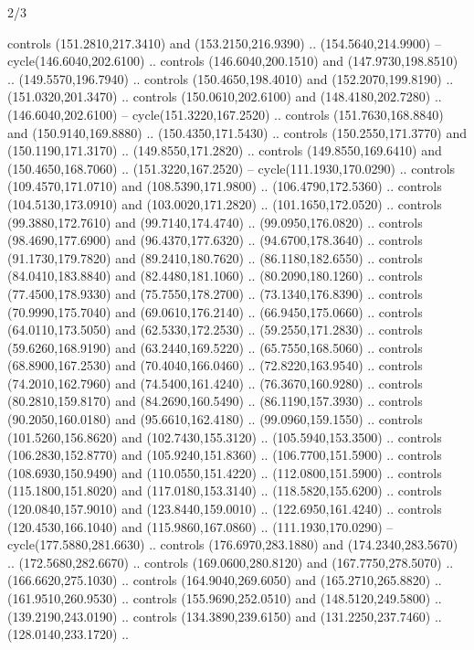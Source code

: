 \begin{flagdescription}{2/3}
\begin{scope}[shift={(0.5\flaglength,0.5)},scale=\flagwidth/480]
\begin{scope}[y=0.8pt, x=0.80pt, yscale=-1,shift={(-450,-300)}]
\begin{scope}[cm={{1.02948,0.0,0.0,1.02948,(-13.26599,6.99414)}}]
\begin{scope}[shift={(341.0917,90.34325)}]
  controls (151.2810,217.3410) and (153.2150,216.9390) .. (154.5640,214.9900) --
  cycle(146.6040,202.6100) .. controls (146.6040,200.1510) and
  (147.9730,198.8510) .. (149.5570,196.7940) .. controls (150.4650,198.4010) and
  (152.2070,199.8190) .. (151.0320,201.3470) .. controls (150.0610,202.6100) and
  (148.4180,202.7280) .. (146.6040,202.6100) -- cycle(151.3220,167.2520) ..
  controls (151.7630,168.8840) and (150.9140,169.8880) .. (150.4350,171.5430) ..
  controls (150.2550,171.3770) and (150.1190,171.3170) .. (149.8550,171.2820) ..
  controls (149.8550,169.6410) and (150.4650,168.7060) .. (151.3220,167.2520) --
  cycle(111.1930,170.0290) .. controls (109.4570,171.0710) and
  (108.5390,171.9800) .. (106.4790,172.5360) .. controls (104.5130,173.0910) and
  (103.0020,171.2820) .. (101.1650,172.0520) .. controls (99.3880,172.7610) and
  (99.7140,174.4740) .. (99.0950,176.0820) .. controls (98.4690,177.6900) and
  (96.4370,177.6320) .. (94.6700,178.3640) .. controls (91.1730,179.7820) and
  (89.2410,180.7620) .. (86.1180,182.6550) .. controls (84.0410,183.8840) and
  (82.4480,181.1060) .. (80.2090,180.1260) .. controls (77.4500,178.9330) and
  (75.7550,178.2700) .. (73.1340,176.8390) .. controls (70.9990,175.7040) and
  (69.0610,176.2140) .. (66.9450,175.0660) .. controls (64.0110,173.5050) and
  (62.5330,172.2530) .. (59.2550,171.2830) .. controls (59.6260,168.9190) and
  (63.2440,169.5220) .. (65.7550,168.5060) .. controls (68.8900,167.2530) and
  (70.4040,166.0460) .. (72.8220,163.9540) .. controls (74.2010,162.7960) and
  (74.5400,161.4240) .. (76.3670,160.9280) .. controls (80.2810,159.8170) and
  (84.2690,160.5490) .. (86.1190,157.3930) .. controls (90.2050,160.0180) and
  (95.6610,162.4180) .. (99.0960,159.1550) .. controls (101.5260,156.8620) and
  (102.7430,155.3120) .. (105.5940,153.3500) .. controls (106.2830,152.8770) and
  (105.9240,151.8360) .. (106.7700,151.5900) .. controls (108.6930,150.9490) and
  (110.0550,151.4220) .. (112.0800,151.5900) .. controls (115.1800,151.8020) and
  (117.0180,153.3140) .. (118.5820,155.6200) .. controls (120.0840,157.9010) and
  (123.8440,159.0010) .. (122.6950,161.4240) .. controls (120.4530,166.1040) and
  (115.9860,167.0860) .. (111.1930,170.0290) -- cycle(177.5880,281.6630) ..
  controls (176.6970,283.1880) and (174.2340,283.5670) .. (172.5680,282.6670) ..
  controls (169.0600,280.8120) and (167.7750,278.5070) .. (166.6620,275.1030) ..
  controls (164.9040,269.6050) and (165.2710,265.8820) .. (161.9510,260.9530) ..
  controls (155.9690,252.0510) and (148.5120,249.5800) .. (139.2190,243.0190) ..
  controls (134.3890,239.6150) and (131.2250,237.7460) .. (128.0140,233.1720) ..

\end{scope}
\end{scope}
\end{scope}
\end{scope}
\end{flagdescription}
